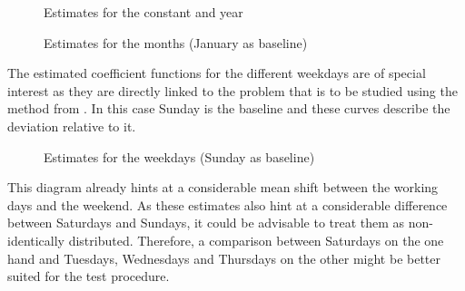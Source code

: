 \documentclass[12pt, a4paper]{article}
\theoremstyle{MAstyle} \newtheorem{assumption}{Assumption}[section]
\theoremstyle{MAstyle} \newtheorem{definition}{Definition}[section]
\theoremstyle{MAstyle} \newtheorem{theorem}{Theorem}[section]
\begin{document}
			\begin{figure}[H]
				\caption{Estimates for the constant and year}
				\label{estimates_const_year}
			\end{figure}
		
			\begin{figure}[H]
				\caption{Estimates for the months (January as baseline)}
				\label{estimates_months}
			\end{figure}
		
			The estimated coefficient functions for the different weekdays are of special interest as they are directly linked to the problem that is to be studied using the method from \cite{bugni_permutation_2021}. In this case Sunday is the baseline and these curves describe the deviation relative to it.
			\begin{figure}[H]
				\caption{Estimates for the weekdays (Sunday as baseline)}
				\label{estimates_weekdays}
			\end{figure}
			This diagram already hints at a considerable mean shift between the working days and the weekend. As these estimates also hint at a considerable difference between Saturdays and Sundays, it could be advisable to treat them as non-identically distributed. Therefore, a comparison between Saturdays on the one hand and Tuesdays, Wednesdays and Thursdays on the other might be better suited for the test procedure.
			
\end{document}
